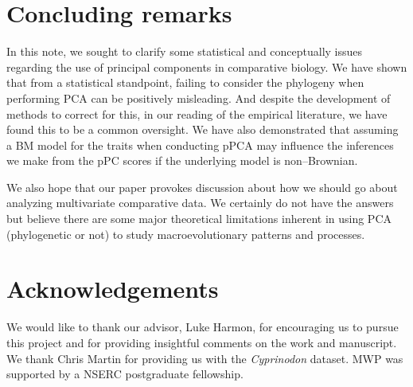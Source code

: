 \documentclass[a4paper,11pt]{article}
\begin{document}
\section{Concluding remarks}
In this note, we sought to clarify some statistical and conceptually issues regarding the use of principal components in comparative biology. We have shown that from a statistical standpoint, failing to consider the phylogeny when performing PCA can be positively misleading. And despite the development of methods to correct for this, in our reading of the empirical literature, we have found this to be a common oversight. We have also demonstrated that assuming a BM model for the traits when conducting pPCA may influence the inferences we make from the pPC scores if the underlying model is non--Brownian. 

We also hope that our paper provokes discussion about how we should go about analyzing multivariate comparative data. We certainly do not have the answers but believe there are some major theoretical limitations inherent in using PCA (phylogenetic or not) to study macroevolutionary patterns and processes.

\section{Acknowledgements}

We would like to thank our advisor, Luke Harmon, for encouraging us to pursue this project and for providing insightful comments on the work and manuscript. We thank Chris Martin for providing us with the \emph{Cyprinodon} dataset. MWP was supported by a NSERC postgraduate fellowship. 

\newpage


\end{document}
